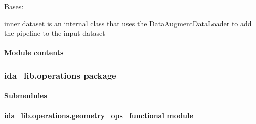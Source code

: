 \documentclass[letterpaper,10pt,english]{sphinxmanual}
\begin{document}
\begin{fulllineitems}
\begin{fulllineitems}
\label{\detokenize{ida_lib.image_augmentation:ida_lib.image_augmentation.data_loader.AugmentDataLoader.InnerDataset}}
Bases: 

inner dataset is an internal class that uses the DataAugmentDataLoader to add the pipeline to the input dataset

\end{fulllineitems}


\end{fulllineitems}



\paragraph{Module contents}
\label{\detokenize{ida_lib.image_augmentation:module-ida_lib.image_augmentation}}\label{\detokenize{ida_lib.image_augmentation:module-contents}}

\subsubsection{ida\_lib.operations package}
\label{\detokenize{ida_lib.operations:ida-lib-operations-package}}\label{\detokenize{ida_lib.operations::doc}}

\paragraph{Submodules}
\label{\detokenize{ida_lib.operations:submodules}}

\paragraph{ida\_lib.operations.geometry\_ops\_functional module}
\label{\detokenize{ida_lib.operations:module-ida_lib.operations.geometry_ops_functional}}\label{\detokenize{ida_lib.operations:ida-lib-operations-geometry-ops-functional-module}}
\end{document}
